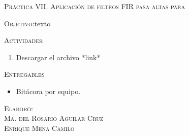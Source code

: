 \documentclass[10pt,letterpaper,spanish,twoside]{report}
\begin{document}
\docdate

\begin{center}
\textsc{\asignatura}\vspace{.2em}
\end{center}

\textsc{Práctica VII. Aplicación de filtros FIR pasa altas para }

\textsc{Objetivo:}texto

\textsc{Actividades:}
\begin{enumerate}
  \item Descargar el archivo *link*
\end{enumerate}

\textsc{Entregables}
\begin{itemize}
  \item Bitácora por equipo.
\end{itemize}

\vfill
\begin{flushright}
\textsc{Elaboró:\\
Ma. del Rosario Aguilar Cruz\\
Enrique Mena Camilo}
\end{flushright}
\end{document}
